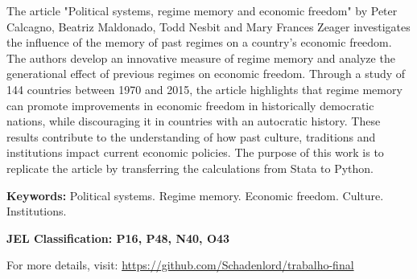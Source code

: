 \documentclass[
	article,
	12pt,
	oneside,
	a4paper,
	english,
	brazil,
	sumario=tradicional
]{abntex2}
\begin{document}
\frenchspacing

\maketitle
{}

	\begin{resumoumacoluna}
	\noindent
	The article "Political systems, regime memory and economic freedom" by Peter Calcagno, Beatriz Maldonado, Todd Nesbit and Mary Frances Zeager investigates the influence of the memory of past regimes on a country's economic freedom. The authors develop an innovative measure of regime memory and analyze the generational effect of previous regimes on economic freedom. Through a study of 144 countries between 1970 and 2015, the article highlights that regime memory can promote improvements in economic freedom in historically democratic nations, while discouraging it in countries with an autocratic history. These results contribute to the understanding of how past culture, traditions and institutions impact current economic policies. The purpose of this work is to replicate the article by transferring the calculations from Stata to Python.
	
	\textbf{Keywords:} Political systems. Regime memory. Economic freedom. Culture. Institutions.
	
	\textbf{JEL Classification: P16, P48, N40, O43}

	For more details, visit: \url{https://github.com/Schadenlord/trabalho-final}

	\end{resumoumacoluna}

\newpage
\end{document}

